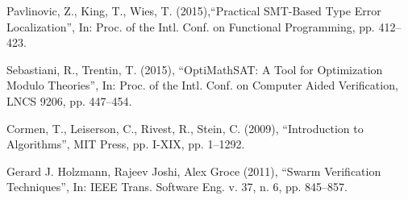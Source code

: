 \begin{thebibliography}{5}
Pavlinovic, Z., King, T., Wies, T. (2015),{``Practical SMT-Based Type Error Localization''}, In: Proc. of the Intl. Conf. on Functional Programming, pp. 412--423.

Sebastiani, R., Trentin, T. (2015), {``OptiMathSAT: A Tool for Optimization Modulo Theories''}, In: Proc. of the Intl. Conf. on Computer Aided Verification, LNCS 9206, pp. 447--454.

Cormen, T., Leiserson, C., Rivest, R., Stein, C. (2009), {``Introduction to Algorithms''}, MIT Press, pp. I-XIX, pp. 1--1292.

Gerard J. Holzmann, Rajeev Joshi, Alex Groce (2011), {``Swarm Verification Techniques''}, In: IEEE Trans. Software Eng. v. 37, n. 6, pp. 845--857.

\end{thebibliography}




